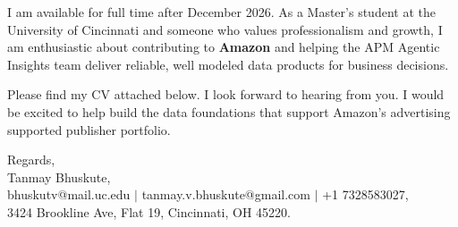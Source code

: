 \documentclass[11pt]{letter}
\begin{document}
\begin{letter}{}
I am available for full time after December 2026. As a Master's student at the University of Cincinnati and someone who values professionalism and growth, I am enthusiastic about contributing to \textbf{Amazon} and helping the APM Agentic Insights team deliver reliable, well modeled data products for business decisions.

Please find my CV attached below. I look forward to hearing from you. I would be excited to help build the data foundations that support Amazon's advertising supported publisher portfolio.

{\setlength{\parskip}{0pt}
Regards,\\
Tanmay Bhuskute,\\
bhuskutv@mail.uc.edu $\mid$ tanmay.v.bhuskute@gmail.com $\mid$ +1 7328583027,\\
3424 Brookline Ave, Flat 19, Cincinnati, OH 45220.
}

\end{letter}
\end{document}
